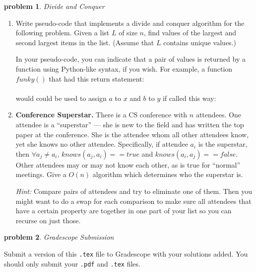 \documentclass[10pt]{article}
\newtheorem{problem}{\sc\color{cit}problem}
\begin{document}
    \begin{problem} Divide and Conquer \end{problem}
    
    \begin{enumerate}
    \item
	Write pseudo-code that implements a divide and conquer algorithm for the following problem.  Given a list $L$ of size $n$,  find values of the largest and second largest items in the list.  (Assume that $L$ contains unique values.)
	
	In your pseudo-code,  you can indicate that a pair of values is returned by a function using Python-like syntax, if you wish.  For example,  a function $funky()$ that had this return statement:\\
	\hspace*{3em}{\tt return a, b} \\
	would could be used to assign $a$ to $x$ and $b$ to $y$ if called this way: \\
	\hspace*{3em}{\tt (x, y) = funky()}
	
\item
\textbf{Conference Superstar.}  There is a CS conference with $n$ attendees. One attendee is a ``superstar'' --- she is new to the field and has written the top paper at the conference.  She is the attendee whom all other attendees know, yet she knows no other attendee.  Specifically, if attendee $a_i$ is the superstar, then $\forall a_j \neq a_i$, $knows(a_j, a_i) == true$ and $knows(a_i, a_j) == false$.  Other attendees may or may not know each other, as is true for ``normal'' meetings.  Give a $O(n)$ algorithm which determines who the superstar is.

\emph{Hint:} Compare pairs of attendees and try to eliminate one of them. Then you might  want to do a swap for each comparison to make sure all attendees that have a certain property are together in one part of your list so you can recurse on just those.
      \end{enumerate}   

\begin{problem} Gradescope Submission \end{problem}
Submit a version of this \verb|.tex| file to Gradescope with your solutions added.  You should only submit your \verb|.pdf| and \verb|.tex| files.

%
%
\end{document}

